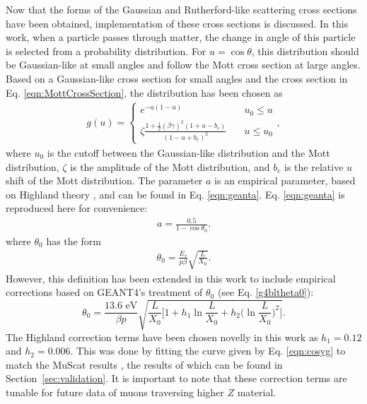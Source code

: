 \label{ssc:COSYScatteringImplementation} Now that the forms of the Gaussian and Rutherford-like scattering cross sections have been obtained, implementation of these cross sections is discussed. In this work, when a particle passes through matter, the change in angle of this particle is selected from a probability distribution. For $u=\cos\theta$, this distribution should be Gaussian-like at small angles \cite{gs} and follow the Mott cross section at large angles. Based on a Gaussian-like cross section for small angles and the cross section in Eq. \eqref{eqn:MottCrossSection}, the distribution has been chosen as
\begin{align}\label{eqn:cosyg}
g(u)=	\begin{cases}
	e^{-a(1-u)} & \quad u_0 \leq u \\
	\zeta\frac{1+\frac{1}{2}(\beta\gamma)^2(1+u-b_c)}{(1-u+b_c)^2} & \quad u\leq u_0
	\end{cases},
\end{align}
where $u_0$ is the cutoff between the Gaussian-like distribution and the Mott distribution, $\zeta$ is the amplitude of the Mott distribution, and $b_c$ is the relative $u$ shift of the Mott distribution. The parameter $a$ is an empirical parameter, based on Highland theory \cite{highland}, and can be found in Eq. \eqref{eqn:geanta}. Eq. \eqref{eqn:geanta} is reproduced here for convenience:
\begin{align*}
a=\frac{0.5}{1-\cos\theta_0}.
\end{align*}
where $\theta_0$ has the form \cite{highland} 
\begin{align*}
\theta_0 = \frac{E_s}{p\beta} \sqrt{\frac{L}{X_0}}.
\end{align*}
However, this definition has been extended in this work to include empirical corrections based on GEANT4's \cite{geant4} treatment of $\theta_0$ (see Eq. \eqref{g4bltheta0}):
\begin{equation}\label{eqn:cosytheta0}
\theta_0 = \frac{13.6 \text{ eV}}{\beta p} \sqrt{\frac{L}{X_0} \Big[ 1+h_1 \ln \frac{L}{X_0} + h_2 \Big(\ln \frac{L}{X_0}\Big)^2 \Big] }.
\end{equation}
The Highland correction terms have been chosen novelly in this work as $h_1=0.12$ and $h_2=0.006$. This was done by fitting the curve given by Eq. \eqref{eqn:cosyg} to match the MuScat results \cite{muscat}, the results of which can be found in Section~\ref{sec:validation}. It is important to note that these correction terms are tunable for future data of muons traversing higher $Z$ material.

